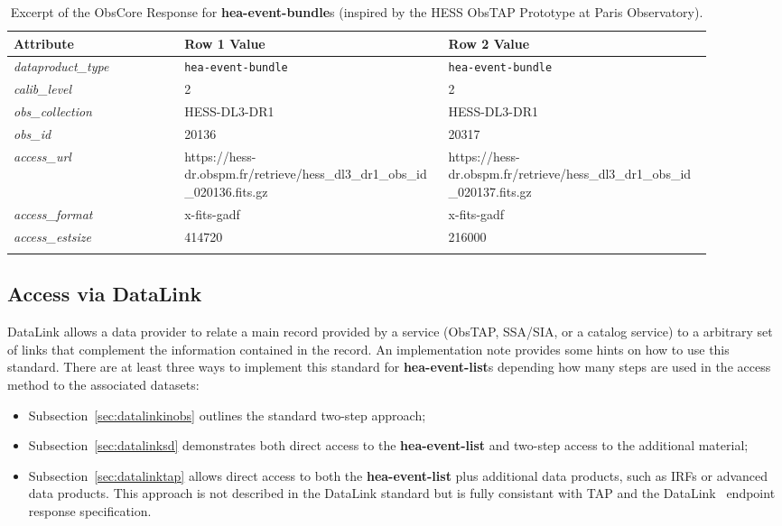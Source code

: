 \begin{longtable}{|m{0.22\linewidth}|m{0.34\linewidth}|m{0.34\linewidth}|}
\hline
{\bf Attribute}&{\bf Row 1 Value}&{\bf Row 2 Value}\\
\hline
{\em dataproduct\_type\/}& {\tt hea-event-bundle}&{\tt hea-event-bundle}\\
\hline
{\em calib\_level\/}& 2&2\\
\hline
{\em obs\_collection\/}& HESS-DL3-DR1&HESS-DL3-DR1\\
\hline
{\em obs\_id\/}&20136&20317\\
\hline
{\em access\_url\/}& \footnotesize{https://hess-dr.obspm.fr/\newline retrieve/hess\_dl3\_dr1\_obs\newline\_id\_020136.fits.gz}&\footnotesize{https://hess-dr.obspm.fr/\newline retrieve/hess\_dl3\_dr1\_obs\newline\_id\_020137.fits.gz}\\
\hline
{\em access\_format\/}&x-fits-gadf&x-fits-gadf\\
\hline
{\em access\_estsize\/}&414720&216000\\
\hline
\caption{Excerpt of the ObsCore Response for {\bf hea-event-bundle}s (inspired by the \gls{HESS} ObsTAP Prototype at Paris Observatory).}
\label{tab:bundle}
\end{longtable}

\subsection{Access via DataLink}
\label{sec:datalink}


DataLink \citep{2023ivoa.spec.1215B} allows a data provider to relate a main record provided by a service (ObsTAP, SSA/SIA, or a catalog service) to a arbitrary set of links that complement the information contained in the record. An implementation note \citep{2024ivoa.note.datalink} provides some hints on how to use this standard.
There are at least three ways to implement this standard for {\bf hea-event-list}s depending how many steps are used in the access method to the associated datasets:
 \begin{itemize}
	\item Subsection~\ref{sec:datalinkinobs} outlines the standard two-step approach;
	\item Subsection~\ref{sec:datalinksd} demonstrates both direct access to the {\bf hea-event-list} and two-step access to the additional material;
 	\item Subsection~\ref{sec:datalinktap} allows direct access to both the {\bf hea-event-list} plus additional data products, such as \glspl{IRF} or advanced data products.  This approach is not described in the DataLink standard but is fully consistant with TAP and the DataLink \blinks\ endpoint response specification.
 \end{itemize}
	 
